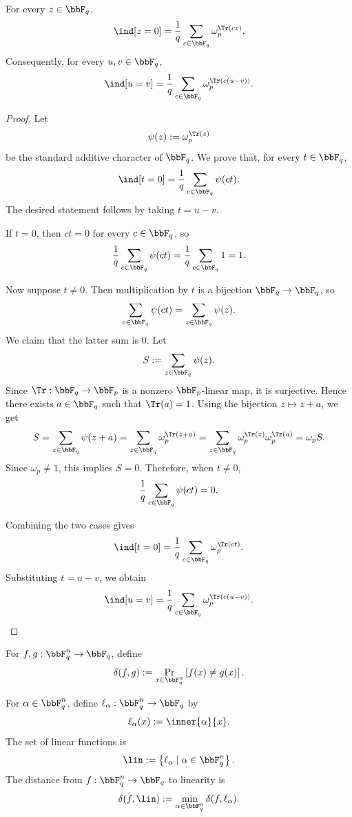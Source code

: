 \begin{lemma}
\label{lem:character-sum-indicator}
For every $z\in\bbF_q$,
\[
    \ind[z=0]
    = \frac{1}{q}\sum_{c\in\bbF_q}\omega_p^{\Tr(cz)}.
\]
Consequently, for every $u,v\in\bbF_q$,
\[
    \ind[u=v]
    = \frac{1}{q}\sum_{c\in\bbF_q}\omega_p^{\Tr(c(u-v))}.
\]
\end{lemma}
\begin{proof}
Let
\[
    \psi(z) := \omega_p^{\Tr(z)}
\]
be the standard additive character of \(\bbF_q\). We prove that, for every
\(t\in \bbF_q\),
\[
    \ind[t=0]
    =
    \frac{1}{q}\sum_{c\in\bbF_q}\psi(ct).
\]
The desired statement follows by taking \(t=u-v\).

If \(t=0\), then \(ct=0\) for every \(c\in\bbF_q\), so
\[
    \frac{1}{q}\sum_{c\in\bbF_q}\psi(ct)
    =
    \frac{1}{q}\sum_{c\in\bbF_q}1
    =
    1.
\]

Now suppose \(t\neq 0\). Then multiplication by \(t\) is a bijection
\(\bbF_q\to\bbF_q\), so
\[
    \sum_{c\in\bbF_q}\psi(ct)
    =
    \sum_{z\in\bbF_q}\psi(z).
\]
We claim that the latter sum is \(0\). Let
\[
    S:=\sum_{z\in\bbF_q}\psi(z).
\]
Since \(\Tr:\bbF_q\to\bbF_p\) is a nonzero \(\bbF_p\)-linear map, it is
surjective. Hence there exists \(a\in\bbF_q\) such that \(\Tr(a)=1\).
Using the bijection \(z\mapsto z+a\), we get
\[
    S
    =
    \sum_{z\in\bbF_q}\psi(z+a)
    =
    \sum_{z\in\bbF_q}\omega_p^{\Tr(z+a)}
    =
    \sum_{z\in\bbF_q}\omega_p^{\Tr(z)}\omega_p^{\Tr(a)}
    =
    \omega_p S.
\]
Since \(\omega_p\neq 1\), this implies \(S=0\). Therefore, when
\(t\neq 0\),
\[
    \frac{1}{q}\sum_{c\in\bbF_q}\psi(ct)=0.
\]

Combining the two cases gives
\[
    \ind[t=0]
    =
    \frac{1}{q}\sum_{c\in\bbF_q}\omega_p^{\Tr(ct)}.
\]
Substituting \(t=u-v\), we obtain
\[
    \ind[u=v]
    =
    \frac{1}{q}\sum_{c\in\bbF_q}\omega_p^{\Tr(c(u-v))}.
\]
\end{proof}

\begin{definition}
\label{def:relative-hamming-distance}
For $f,g:\bbF_q^n\to\bbF_q$, define
\[
    \delta(f,g)
    := \Pr_{x\in\bbF_q^n}\left[f(x)\ne g(x)\right].
\]
\end{definition}

\begin{definition}
\label{def:linear-functions}
For $\alpha\in\bbF_q^n$, define $\ell_\alpha:\bbF_q^n\to\bbF_q$ by
\[
    \ell_\alpha(x):=\inner{\alpha}{x}.
\]
The set of linear functions is
\[
    \lin := \left\{\ell_\alpha \mid \alpha\in\bbF_q^n\right\}.
\]
The distance from $f:\bbF_q^n\to\bbF_q$ to linearity is
\[
    \delta(f,\lin):=\min_{\alpha\in\bbF_q^n}\delta(f,\ell_\alpha).
\]
\end{definition}

